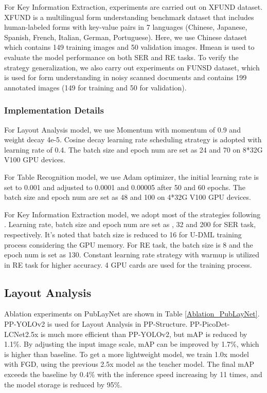 \documentclass[letterpaper]{article} \usepackage{aaai21}  \usepackage{times}  \usepackage{helvet} \usepackage{courier}  \usepackage[hyphens]{url}  \usepackage{graphicx} \usepackage{algorithm}
\begin{document}
For Key Information Extraction, experiments are carried out on XFUND dataset\cite{xfund_dataset}. XFUND\cite{xfund_dataset} is a multilingual form understanding benchmark dataset that includes human-labeled forms with key-value pairs in 7 languages (Chinese, Japanese, Spanish, French, Italian, German, Portuguese). Here, we use Chinese dataset which contains 149 training images and 50 validation images. Hmean is used to evaluate the model performance on both SER and RE tasks. To verify the strategy generalization, we also carry out experiments on FUNSD dataset\cite{funsd_dataset}, which is used for form understanding in noisy scanned documents and contains 199 annotated images (149 for training and 50 for validation).

    
\subsubsection{Implementation Details}

For Layout Analysis model, we use Momentum with momentum of 0.9 and weight decay 4e-5. Cosine decay learning rate scheduling strategy is adopted with learning rate of 0.4. The batch size and epoch num are set as 24 and 70 on 8*32G V100 GPU devices.

For Table Recognition model, we use Adam optimizer, the initial learning rate is set to 0.001 and adjusted to 0.0001 and 0.00005 after 50 and 60 epochs. The batch size and epoch num are set as 48 and 100 on 4*32G V100 GPU devices.

For Key Information Extraction model, we adopt most of the strategies following \cite{xylayoutlm}. Learning rate, batch size and epoch num are set as , 32 and 200 for SER task, respectively. It's noted that batch size is reduced to 16 for U-DML training process considering the GPU memory. For RE task, the batch size is 8 and the epoch num is set as 130. Constant learning rate strategy with warmup is utilized in RE task for higher accuracy. 4 GPU cards are used for the training process.


\subsection{Layout Analysis}

Ablation experiments on PubLayNet are shown in Table \ref{Ablation_PubLayNet}. PP-YOLOv2 is used for Layout Analysis in PP-Structure. PP-PicoDet-LCNet2.5x is much more efficient than PP-YOLOv2, but mAP is reduced by 1.1\%. By adjusting the input image scale, mAP can be improved by 1.7\%, which is higher than baseline. To get a more lightweight model, we train 1.0x model with FGD, using the previous 2.5x model as the teacher model. The final mAP exceeds the baseline by 0.4\% with the inference speed increasing by 11 times, and the model storage is reduced by 95\%.
\end{document}
